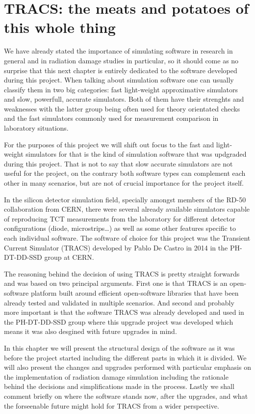 \chapter{TRACS: the meats and potatoes of this whole thing}
\label{chap:Comp}

We have already stated the importance of simulating software in research in general and in radiation damage studies in particular, so it should come as no surprise that this next chapter is entirely dedicated to the software developed during this project. When talking about simulation software one can usually classify them in two big categories: fast light-weight approximative simulators and slow, powerfull, accurate simulators. Both of them have their strenghts and weaknesses with the latter group being often used for theory orientated checks and the fast simulators commonly used for measurement comparison in laboratory situations.

For the purposes of this project we will shift out focus to the fast and light-weight simulators for that is the kind of simulation software that was updgraded during this project. That is not to say that slow accurate simulators are not useful for the project, on the contrary both software types can complement each other in many scenarios, but are not of crucial importance for the project itself.

In the silicon detector simulation field, specially amongst members of the RD-50 collaboration from CERN, there were several already available simulators capable of reproducing TCT measurements from the laboratory for different detector configurations (diode, microstrips\ldots) as well as some other features specific to each individual software. The software of choice for this project was the Transient Current Simulator (TRACS) developed by Pablo De Castro in 2014 in the PH-DT-DD-SSD group at CERN. 

The reasoning behind the decision of using TRACS is pretty straight forwards and was based on two principal arguments. First one is that TRACS is an open-software platform built around efficient open-software libraries that have been already tested and validated in multiple scenarios. And second and probably more important is that the software TRACS was already developed and used in the PH-DT-DD-SSD group where this upgrade project was developed which means it was also desgined with future upgrades in mind. 

In this chapter we will present the structural design of the software as it was before the project started including the different parts in which it is divided. We will also present the changes and upgrades performed with particular emphasis on the implementation of radiation damage simulation including the rationale behind the decisions and simplifications made in the process. Lastly we shall comment briefly on where the software stands now, after the upgrades, and what the forseenable future might hold for TRACS from a wider perspective.

